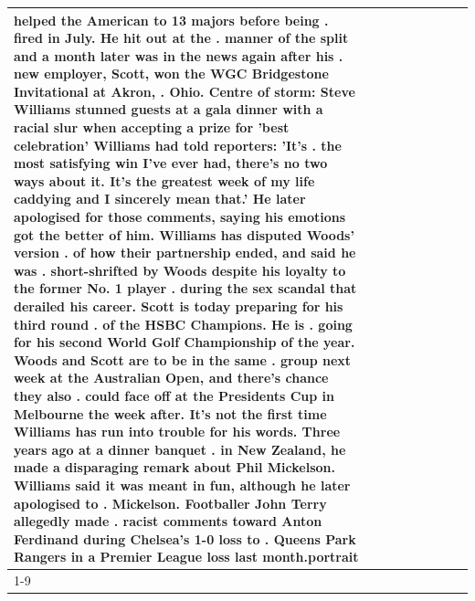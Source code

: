 \begin{table}[H]
\begin{tabular}{lllrlllll}
helped the American to 13 majors before being . fired in July. He hit out at the . manner of the split and a month later was in the news again after his . new employer, Scott, won the WGC Bridgestone Invitational at Akron, . Ohio. Centre of storm: Steve Williams stunned guests at a gala dinner with a racial slur when accepting a prize for 'best celebration' Williams had told reporters: 'It's . the most satisfying win I've ever had, there's no two ways about it. It's the greatest week of my life caddying and I sincerely mean that.' He later apologised for those comments, saying his emotions got the better of him. Williams has disputed Woods' version . of how their partnership ended, and said he was . short-shrifted by Woods despite his loyalty to the former No. 1 player . during the sex scandal that derailed his career. Scott is today preparing for his third round . of the HSBC Champions. He is . going for his second World Golf Championship of the year. Woods and Scott are to be in the same . group next week at the Australian Open, and there's chance they also . could face off at the Presidents Cup in Melbourne the week after. It's not the first time Williams has run into trouble for his words. Three years ago at a dinner banquet . in New Zealand, he made a disparaging remark about Phil Mickelson. Williams said it was meant in fun, although he later apologised to . Mickelson. Footballer John Terry allegedly made . racist comments toward Anton Ferdinand during Chelsea's 1-0 loss to . Queens Park Rangers in a Premier League loss last month.portrait \\
\cline{1-9}

\end{tabular}
\end{table}
